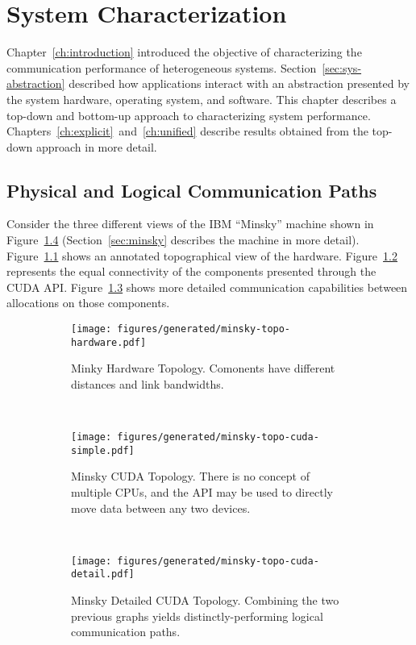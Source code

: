 \chapter{System Characterization}
\label{ch:sys-char}

Chapter~\ref{ch:introduction} introduced the objective of characterizing the communication performance of heterogeneous systems.
Section~\ref{sec:sys-abstraction} described how applications interact with an abstraction presented by the system hardware, operating system, and software.
This chapter describes a top-down and bottom-up approach to characterizing system performance. 
Chapters~\ref{ch:explicit}~and~\ref{ch:unified} describe results obtained from the top-down approach in more detail.

\section{Physical and Logical Communication Paths}

Consider the three different views of the IBM ``Minsky'' machine shown in Figure~\ref{fig:minsky-hardware-logical} (Section~\ref{sec:minsky} describes the machine in more detail).
Figure~\ref{fig:minsky-topo-hardware}    shows an annotated topographical view of the hardware.
Figure~\ref{fig:minsky-topo-cuda-simple} represents the equal connectivity of the components presented through the CUDA API.
Figure~\ref{fig:minsky-topo-cuda-detail} shows more detailed communication capabilities between allocations on those components.

\begin{figure}[ht]
    \centering
    \begin{subfigure}[b]{0.3\textwidth}
        \texttt{[image: figures/generated/minsky-topo-hardware.pdf]}
        \caption{Minky Hardware Topology. Comonents have different distances and link bandwidths.}
        \label{fig:minsky-topo-hardware}
    \end{subfigure}
    ~
    \begin{subfigure}[b]{0.3\textwidth}
        \texttt{[image: figures/generated/minsky-topo-cuda-simple.pdf]}
        \caption{Minsky CUDA Topology. 
                 There is no concept of multiple CPUs, and the API may be used to directly move data between any two devices.}
        \label{fig:minsky-topo-cuda-simple}
    \end{subfigure}
    ~
    \begin{subfigure}[b]{0.3\textwidth}
        \texttt{[image: figures/generated/minsky-topo-cuda-detail.pdf]}
        \caption{Minsky Detailed CUDA Topology.
                Combining the two previous graphs yields distinctly-performing logical communication paths.}
        \label{fig:minsky-topo-cuda-detail}
    \end{subfigure}
    \caption[]{}
    \label{fig:minsky-hardware-logical}
\end{figure}


